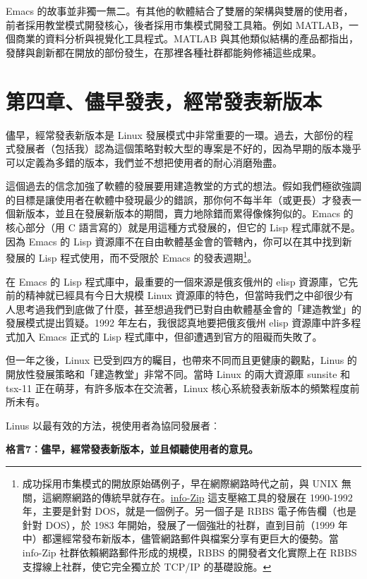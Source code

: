 \documentclass[12pt,]{article}
\begin{document}
Emacs
的故事並非獨一無二。有其他的軟體結合了雙層的架構與雙層的使用者，前者採用教堂模式開發核心，後者採用市集模式開發工具箱。例如
MATLAB，一個商業的資料分析與視覺化工具程式。MATLAB
與其他類似結構的產品都指出，發酵與創新都在開放的部份發生，在那裡各種社群都能夠修補這些成果。

\newpage
\section{第四章、儘早發表，經常發表新版本}

儘早，經常發表新版本是 Linux
發展模式中非常重要的一環。過去，大部份的程式發展者（包括我）認為這個策略對較大型的專案是不好的，因為早期的版本幾乎可以定義為多錯的版本，我們並不想把使用者的耐心消磨殆盡。

這個過去的信念加強了軟體的發展要用建造教堂的方式的想法。假如我們極欲強調的目標是讓使用者在軟體中發現最少的錯誤，那你何不每半年（或更長）才發表一個新版本，並且在發展新版本的期間，賣力地除錯而累得像條狗似的。Emacs
的核心部分（用 C 語言寫的）就是用這種方式發展的，但它的 Lisp
程式庫就不是。因為 Emacs 的 Lisp
資源庫不在自由軟體基金會的管轄內，你可以在其中找到新發展的 Lisp
程式使用，而不受限於 Emacs 的發表週期\footnote{成功採用市集模式的開放原始碼例子，早在網際網路時代之前，與
  UNIX
  無關，這網際網路的傳統早就存在。\href{http://www.cdrom.com/pub/infozip/}{info-Zip}
  這支壓縮工具的發展在 1990-1992 年，主要是針對
  DOS，就是一個例子。另一個子是 RBBS 電子佈告欄（也是針對 DOS），於 1983
  年開始，發展了一個強壯的社群，直到目前（1999
  年中）都還經常發布新版本，儘管網路郵件與檔案分享有更巨大的優勢。當
  info-Zip 社群依賴網路郵件形成的規模，RBBS 的開發者文化實際上在 RBBS
  支撐線上社群，使它完全獨立於 TCP/IP 的基礎設施。}。

在 Emacs 的 Lisp 程式庫中，最重要的一個來源是俄亥俄州的 elisp
資源庫，它先前的精神就已經具有今日大規模 Linux
資源庫的特色，但當時我們之中卻很少有人思考過我們到底做了什麼，甚至想過我們已對自由軟體基金會的「建造教堂」的發展模式提出質疑。1992
年左右，我很認真地要把俄亥俄州 elisp 資源庫中許多程式加入 Emacs 正式的
Lisp 程式庫中，但卻遭遇到官方的阻礙而失敗了。

但一年之後，Linux 已受到四方的矚目，也帶來不同而且更健康的觀點，Linus
的開放性發展策略和「建造教堂」非常不同。當時 Linux 的兩大資源庫 sunsite
和 tsx-11 正在萌芽，有許多版本在交流著，Linux
核心系統發表新版本的頻繁程度前所未有。

Linus 以最有效的方法，視使用者為協同發展者︰

\textbf{格言7︰儘早，經常發表新版本，並且傾聽使用者的意見。}
\end{document}
